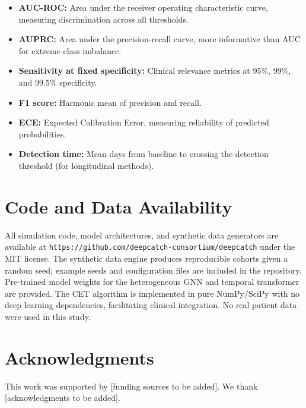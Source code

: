 \documentclass[10pt,a4paper]{article}
\begin{document}
\begin{itemize}
\item \textbf{AUC-ROC:} Area under the receiver operating characteristic curve, measuring discrimination across all thresholds.
\item \textbf{AUPRC:} Area under the precision-recall curve, more informative than AUC for extreme class imbalance.
\item \textbf{Sensitivity at fixed specificity:} Clinical relevance metrics at 95\%, 99\%, and 99.5\% specificity.
\item \textbf{F1 score:} Harmonic mean of precision and recall.
\item \textbf{ECE:} Expected Calibration Error, measuring reliability of predicted probabilities.
\item \textbf{Detection time:} Mean days from baseline to crossing the detection threshold (for longitudinal methods).
\end{itemize}


\section{Code and Data Availability}

All simulation code, model architectures, and synthetic data generators are available at \texttt{https://github.com/deepcatch-consortium/deepcatch} under the MIT license. The synthetic data engine produces reproducible cohorts given a random seed; example seeds and configuration files are included in the repository. Pre-trained model weights for the heterogeneous GNN and temporal transformer are provided. The CET algorithm is implemented in pure NumPy/SciPy with no deep learning dependencies, facilitating clinical integration. No real patient data were used in this study.


\section*{Acknowledgments}
This work was supported by [funding sources to be added]. We thank [acknowledgments to be added].
\end{document}

